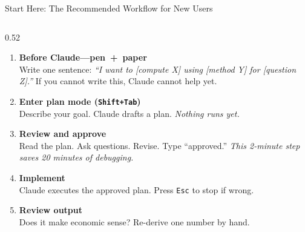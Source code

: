 \documentclass[10pt,english,aspectratio=169]{beamer}
\begin{document}
\begin{frame}{Start Here: The Recommended Workflow for New Users}

\begin{columns}[T]
\begin{column}{0.52\textwidth}
\small
\begin{enumerate}
    \item[\textbf{0.}] \textbf{Before Claude---pen~+~paper}\\
    Write one sentence: \textit{``I want to [compute X] using [method Y] for [question Z].''} If you cannot write this, Claude cannot help yet.

    \vspace{0.1cm}

    \item[\textbf{1.}] \textbf{Enter plan mode (\texttt{Shift+Tab})}\\
    Describe your goal. Claude drafts a plan. \textit{Nothing runs yet.}

    \vspace{0.1cm}

    \item[\textbf{2.}] \textbf{Review and approve}\\
    Read the plan. Ask questions. Revise. Type ``approved.'' \textit{This 2-minute step saves 20 minutes of debugging.}

    \vspace{0.1cm}

    \item[\textbf{3.}] \textbf{Implement}\\
    Claude executes the approved plan. Press \texttt{Esc} to stop if wrong.

    \vspace{0.1cm}

    \item[\textbf{4.}] \textbf{Review output}\\
    Does it make economic sense? Re-derive one number by hand.

    \vspace{0.1cm}


\end{enumerate}
\end{column}
\end{columns}
\end{frame}
\end{document}
